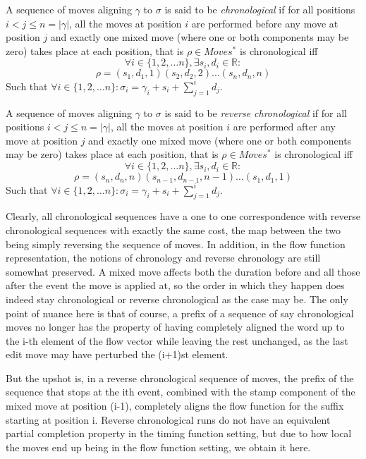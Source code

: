 \documentclass[runningheads]{llncs}
\begin{document}
	\begin{definition}[Chronology]
		A sequence of moves aligning $\gamma$ to $\sigma$ is said to be \textit{chronological} if for all positions $i < j \leq n = |\gamma|$, all the moves at position $i$ are performed before any move at position $j$ and exactly one mixed move (where one or both components may be zero) takes place at each position, that is $\rho \in Moves^*$ is chronological iff  $$\forall i \in \{1, 2, \dots n\},  \exists s_i, d_i \in \mathbb{R} :$$$$ \rho = (s_1, d_1, 1)(s_2, d_2, 2)\dots (s_n, d_n, n) $$
		Such that $\forall i \in \{1, 2, \dots n\} : \sigma_i = \gamma_i + s_i + \sum_{j=1}^{i} d_j$. 
		
	\end{definition}
	
	\begin{definition}
		A sequence of moves aligning $\gamma$ to $\sigma$ is said to be \textit{reverse chronological} if for all positions $i < j \leq n = |\gamma|$, all the moves at position $i$ are performed after any move at position $j$ and exactly one mixed move (where one or both components may be zero) takes place at each position, that is $\rho \in Moves^*$ is chronological iff  $$\forall i \in \{1, 2, \dots n\},  \exists s_i, d_i \in \mathbb{R} : $$$$ \rho = (s_n, d_n, n)(s_{n-1}, d_{n-1}, n-1)\dots (s_1, d_1, 1) $$
		Such that $\forall i \in \{1, 2, \dots n\} : \sigma_i = \gamma_i + s_i + \sum_{j=1}^{i} d_j$. 
	\end{definition}
	
	Clearly, all chronological sequences have a one to one correspondence with reverse chronological sequences with exactly the same cost, the map between the two being simply reversing the sequence of moves. 
	In addition, in the flow function representation, the notions of chronology and reverse chronology are still somewhat preserved. 
	A mixed move affects both the duration before and all those after the event the move is applied at, so the order in which they happen does indeed stay chronological or reverse chronological as the case may be. 
	The only point of nuance here is that of course, a prefix of a sequence of say chronological moves no longer has the property of having completely aligned the word up to the i-th element of the flow vector while leaving the rest unchanged, as the last edit move may have perturbed the (i+1)st element. 
	
	But the upshot is, in a reverse chronological sequence of moves, the prefix of the sequence that stops at the ith event, combined with the stamp component of the mixed move at position (i-1), completely aligns the flow function for the suffix starting at position i. 
	Reverse chronological runs do not have an equivalent partial completion property in the timing function setting, but due to how local the moves end up being in the flow function setting, we obtain it here. 
	
\end{document}
